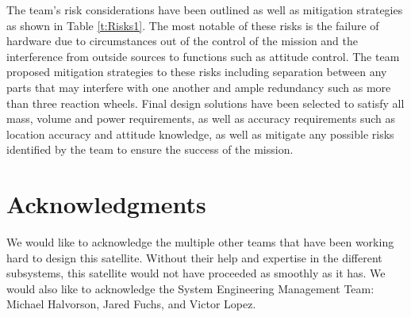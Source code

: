 \documentclass[conf]{new-aiaa}
\begin{document}

The team’s risk considerations have been outlined as well as mitigation strategies as shown in Table \ref{t:Risks1}. The most notable of these risks is the failure of hardware due to circumstances out of the control of the mission and the interference from outside sources to functions such as attitude control. The team proposed mitigation strategies to these risks including separation between any parts that may interfere with one another and ample redundancy such as more than three reaction wheels. Final design solutions have been selected to satisfy all mass, volume and power requirements, as well as accuracy requirements such as location accuracy and attitude knowledge, as well as mitigate any possible risks identified by the team to ensure the success of the mission.


\section*{Acknowledgments}
We would like to acknowledge the multiple other teams that have been working hard to design this satellite. Without their help and expertise in the different subsystems, this satellite would not have proceeded as smoothly as it has. We would also like to acknowledge the System Engineering Management Team: Michael Halvorson, Jared Fuchs, and Victor Lopez.



\end{document}
